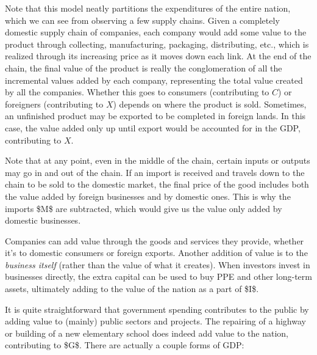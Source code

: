 \documentclass{article}
\begin{document}
    Note that this model neatly partitions the expenditures of the entire nation, which we can see from observing a few supply chains. Given a completely domestic supply chain of companies, each company would add some value to the product through collecting, manufacturing, packaging, distributing, etc., which is realized through its increasing price as it moves down each link. At the end of the chain, the final value of the product is really the conglomeration of all the incremental values added by each company, representing the total value created by all the companies. Whether this goes to consumers (contributing to $C$) or foreigners (contributing to $X$) depends on where the product is sold. Sometimes, an unfinished product may be exported to be completed in foreign lands. In this case, the value added only up until export would be accounted for in the GDP, contributing to $X$.
    \begin{center}
    \end{center}
    Note that at any point, even in the middle of the chain, certain inputs or outputs may go in and out of the chain. If an import is received and travels down to the chain to be sold to the domestic market, the final price of the good includes both the value added by foreign businesses and by domestic ones. This is why the imports \$M\$ are subtracted, which would give us the value only added by domestic businesses.
    \begin{center}
    \end{center}
    Companies can add value through the goods and services they provide, whether it's to domestic consumers or foreign exports. Another addition of value is to the \textit{business itself} (rather than the value of what it creates). When investors invest in businesses directly, the extra capital can be used to buy PPE and other long-term assets, ultimately adding to the value of the nation as a part of \$I\$.
    \begin{center}
    \end{center}
    It is quite straightforward that government spending contributes to the public by adding value to (mainly) public sectors and projects. The repairing of a highway or building of a new elementary school does indeed add value to the nation, contributing to \$G\$.
    There are actually a couple forms of GDP:
\end{document}
